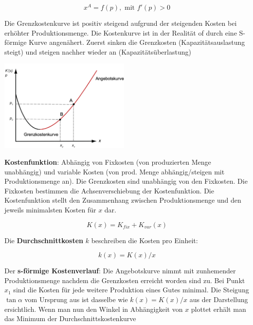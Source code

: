 \documentclass[9pt, landscape, fleqn]{scrartcl}
\begin{document}
\begin{multicols*}{3}
\begin{equation}
    x^A = f(p),  \text{~mit } f'(p) > 0
\end{equation}

Die Grenzkostenkurve ist positiv steigend aufgrund der steigenden Kosten bei erhöhter Produktionsmenge. Die Kostenkurve ist in der Realität of durch eine S-förmige Kurve angenähert. Zuerst sinken die Grenzkosten (Kapazitätsauslastung steigt) und steigen nachher wieder an (Kapazitätsüberlastung) 

\begin{center}
    \includegraphics[width=6.5cm]{Gueterangebotsfunktion_Unternehmen.png}
\end{center}

\textbf{Kostenfunktion}: Abhängig von Fixkosten (von produzierten Menge unabhängig) und variable Kosten (von prod. Menge abhängig/steigen mit Produktionsmenge an). Die Grenzkosten sind unabhängig von den Fixkosten. Die Fixkosten bestimmen die Achsenverschiebung der Kostenfunktion. Die Kostenfunktion stellt den Zusammenhang zwischen Produktionsmenge und den jeweils minimalsten Kosten für $x$ dar.

\begin{equation}
    K(x) = K_{fix} + K_{var}(x)
\end{equation}

Die \textbf{Durchschnittkosten} $k$ beschreiben die Kosten pro Einheit:

\begin{equation}
    k(x) = K(x)/x
\end{equation}

Der \textbf{s-förmige Kostenverlauf}: Die Angebotskurve nimmt mit zunhemender Produktionsmenge nachdem die Grenzkosten erreicht worden sind zu. Bei Punkt $x_1$ sind die Kosten für jede weitere Produktion eines Gutes minimal. Die Steigung $\tan\alpha$ vom Ursprung aus ist dasselbe wie $k(x) = K(x)/x$ aus der Darstellung ersichtlich. Wenn man nun den Winkel in Abhängigkeit von $x$ plottet erhält man das Minimum der Durchschnittskostenkurve


\end{multicols*}
\end{document}
